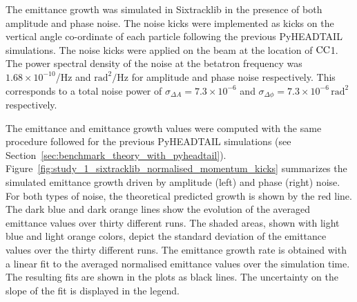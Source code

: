 The emittance growth was simulated in Sixtracklib in the presence of both amplitude and phase noise. The noise kicks were implemented as kicks on the vertical angle co-ordinate of each particle following the previous PyHEADTAIL simulations. The noise kicks were applied on the beam at the location of ${\mathrm{CC}}$1. The power spectral density of the noise at the betatron frequency was $1.68\times 10^{-10}$/Hz and $\mathrm{rad^2/Hz}$ for amplitude and phase noise respectively. This corresponds to a total noise power of $\sigma_{\Delta A}=7.3\times 10^{-6}$ and $\sigma_{\Delta \phi}=7.3\times 10^{-6}$\,$\mathrm{rad^2}$ respectively.


The emittance and emittance growth values were computed with the same procedure followed for the previous PyHEADTAIL simulations (see Section~\ref{sec:benchmark_theory_with_pyheadtail}). Figure~\ref{fig:study_1_sixtracklib_normalised_momentum_kicks} summarizes the simulated emittance growth driven by amplitude (left) and phase (right) noise. For both types of noise, the theoretical predicted growth is shown by the red line. The dark blue and dark orange lines show the evolution of the averaged emittance values over thirty different runs. The shaded areas, shown with light blue and light orange colors, depict the standard deviation of the emittance values over the thirty different runs. The emittance growth rate is obtained with a linear fit to the averaged normalised emittance values over the simulation time. The resulting fits are shown in the plots as black lines. The uncertainty on the slope of the fit is displayed in the legend.

